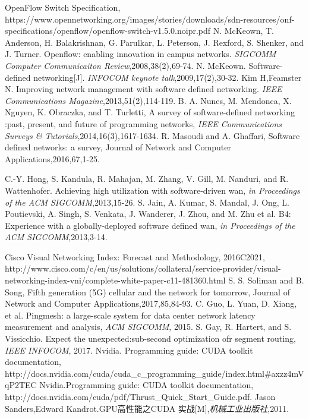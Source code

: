 \documentclass[master]{thesis-uestc}
\begin{document}
\begin{thebibliography}{1}
OpenFlow Switch Specification, https://www.opennetworking.org/images\newline/stories/downloads/sdn-resources/onf-specifications/openflow/openflow-switch-v1.5.0.noipr.pdf
N. McKeown, T. Anderson, H. Balakrishnan, G. Parulkar, L. Peterson, J. Rexford, S. Shenker, and J. Turner. Openflow: enabling innovation in campus networks. \emph{SIGCOMM Computer Communicaiton Review},2008,38(2),69-74.
N. McKeown. Software-defined networking[J]. \emph{INFOCOM keynote talk},2009,17(2),30-32.
Kim H,Feamster N. Improving network management with software defined networking. \emph{IEEE Communications Magazine},2013,51(2),114-119.
B. A. Nunes, M. Mendonca, X. Nguyen, K. Obraczka, and T. Turletti, A survey of software-defined networking :past, present, and future of programming networks, \emph{IEEE Communications Surveys \& Tutorials},2014,16(3),1617-1634.
R. Masoudi and A. Ghaffari, Software defined networks: a survey, Journal of Network and Computer Applications,2016,67,1-25.


C.-Y. Hong, S. Kandula, R. Mahajan, M. Zhang, V. Gill, M. Nanduri, and R. Wattenhofer. Achieving high utilization with software-driven wan, \emph{in Proceedings of the ACM SIGCOMM},2013,15-26.
S. Jain, A. Kumar, S. Mandal, J. Ong, L. Poutievski, A. Singh, S. Venkata, J. Wanderer, J. Zhou, and M. Zhu et al. B4: Experience with a globally-deployed software defined wan, \emph{in Proceedings of the ACM SIGCOMM},2013,3-14.

Cisco Visual Networking Index: Forecast and Methodology, 2016C2021, http://www.cisco.com/c/en/us/solutions/collateral/service-provider/visual-networking-index-vni/complete-white-paper-c11-481360.html
S. S. Soliman and B. Song, Fifth generation (5G) cellular and the network for tomorrow, Journal of Network and Computer Applications,2017,85,84-93.
C. Guo, L. Yuan, D. Xiang, et al. Pingmesh: a large-scale system for data center network latency measurement and analysis, \emph{ACM SIGCOMM}, 2015.
S. Gay, R. Hartert, and S. Vissicchio. Expect the unexpected:sub-second optimization ofr segment routing, \emph{IEEE INFOCOM}, 2017.
Nvidia. Programming guide: CUDA toolkit documentation, http://docs.nvidia.com/cuda/cuda\_c\_programming\_guide/index.html\#axzz4mVqP2TEC
Nvidia.Programming guide: CUDA toolkit documentation, http://docs.nvidia.com/cuda/pdf/Thrust\_Quick\_Start\_Guide.pdf.
Jason Sanders,Edward Kandrot.GPU高性能之CUDA 实战[M],\emph{机械工业出版社},2011.


\end{thebibliography}
\end{document}
